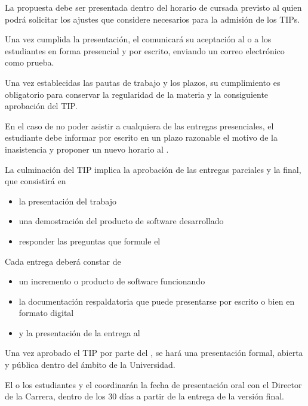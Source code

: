 \articulo La propuesta debe ser presentada dentro del horario de cursada previsto al \profesorTIP
quien podrá solicitar los ajustes que considere necesarios para la admisión de los TIPs. 

\articulo Una vez cumplida la presentación, el \profesorTIP comunicará su aceptación al o a los estudiantes
en forma presencial y por escrito, enviando un correo electrónico como prueba.



\articulo Una vez establecidas las pautas de trabajo y los plazos, 
su cumplimiento es obligatorio para conservar la regularidad de la materia y la consiguiente
aprobación del TIP.

\articulo En el caso de no poder asistir a cualquiera de las entregas presenciales, el estudiante 
debe informar por escrito en un plazo razonable el motivo de la inasistencia y proponer un nuevo 
horario al \profesorTIP .


\articulo La culminación del TIP implica la aprobación de las entregas parciales y la final,
que consistirá en 
\begin{itemize}
 \item la presentación del trabajo
 \item una demostración del producto de software desarrollado
 \item responder las preguntas que formule el \profesorTIP 
\end{itemize}


\articulo Cada entrega deberá constar de
\begin{itemize}
 \item un incremento o producto de software funcionando
 \item la documentación respaldatoria que puede presentarse por escrito o bien en formato digital
 \item y la presentación de la entrega al \profesorTIP
\end{itemize}


\articulo Una vez aprobado el TIP por parte del \profesorTIP, se hará una presentación formal, 
abierta y pública dentro del ámbito de la Universidad. 

\articulo El o los estudiantes y el \profesorTIP
coordinarán la fecha de presentación oral con el Director de la Carrera, dentro de los 30
días a partir de la entrega de la versión final.

